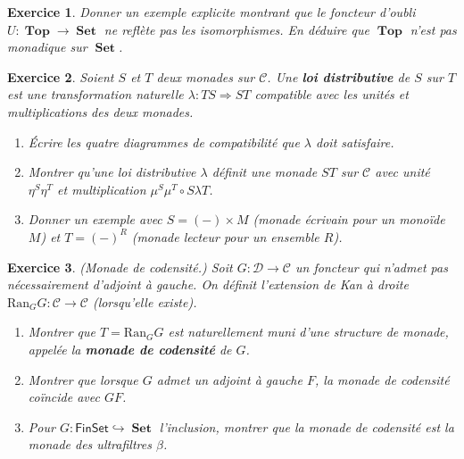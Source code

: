 \documentclass[a4paper,12pt]{book}
\DeclareMathOperator{\Set}{\mathbf{Set}}
\DeclareMathOperator{\Top}{\mathbf{Top}}
\newtheorem{exercice}{Exercice}[chapter]
\begin{document}
\begin{exercice}\label{exo:beck-top}
\index{Top@$\Top$!non monadicité}
Donner un exemple explicite montrant que le foncteur d'oubli
$U \colon \Top \to \Set$ ne reflète pas les isomorphismes.
En déduire que $\Top$ n'est pas monadique sur $\Set$.
\end{exercice}

\begin{exercice}\label{exo:distributive-law}
Soient $S$ et $T$ deux monades sur $\mathcal{C}$.
Une \textbf{loi distributive} de $S$ sur $T$ est une
transformation naturelle $\lambda \colon TS \Rightarrow ST$ compatible
avec les unités et multiplications des deux monades.
\begin{enumerate}[label=(\alph*)]
\item Écrire les quatre diagrammes de compatibilité que $\lambda$ doit
    satisfaire.
\item Montrer qu'une loi distributive $\lambda$ définit une monade
    $ST$ sur $\mathcal{C}$ avec unité $\eta^S \eta^T$ et multiplication
    $\mu^S \mu^T \circ S\lambda T$.
\item Donner un exemple avec $S = (-) \times M$ (monade écrivain pour
    un monoïde $M$) et $T = (-)^R$ (monade lecteur pour un ensemble $R$).
\end{enumerate}
\end{exercice}

\begin{exercice}\label{exo:monade-codensity}
(\emph{Monade de codensité.})
Soit $G \colon \mathcal{D} \to \mathcal{C}$ un foncteur qui
n'admet pas nécessairement d'adjoint à gauche.
On définit l'extension de Kan à droite
$\mathrm{Ran}_G G \colon \mathcal{C} \to \mathcal{C}$ (lorsqu'elle existe).
\begin{enumerate}[label=(\alph*)]
\item Montrer que $T = \mathrm{Ran}_G G$ est naturellement muni d'une
    structure de monade, appelée la \textbf{monade de codensité} de $G$.
\item Montrer que lorsque $G$ admet un adjoint à gauche $F$,
    la monade de codensité coïncide avec $GF$.
\item Pour $G \colon \mathsf{FinSet} \hookrightarrow \Set$ l'inclusion,
    montrer que la monade de codensité est la monade des ultrafiltres $\beta$.
\end{enumerate}
\end{exercice}

\end{document}
